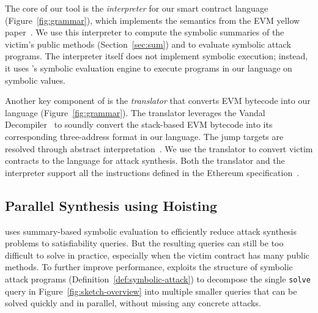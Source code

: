 The core of our tool is the \emph{interpreter} for our smart contract language
(Figure~\ref{fig:grammar}), which implements the semantics from the EVM
yellow paper~\cite{evm-yellow}. We use this interpreter to compute the symbolic
summaries of the victim's public methods (Section~\ref{sec:sum}) and to evaluate
symbolic attack programs. The interpreter itself does not implement symbolic
execution; instead, it uses \rosette's symbolic evaluation engine to execute
programs in our language on symbolic values. 

Another key component of \toolname is the \emph{translator} that converts EVM
bytecode into our language (Figure~\ref{fig:grammar}). The translator leverages the Vandal
Decompiler~\cite{madmax} to soundly convert the stack-based EVM bytecode into
its corresponding three-address format in our language. The jump targets are resolved through abstract
interpretation~\cite{CousotC77}.  We use the translator to convert victim
contracts to the \toolname language for attack synthesis. Both the translator and the
interpreter support all the instructions defined in the Ethereum
specification~\cite{yellowpaper}.




\subsection{Parallel Synthesis using Hoisting}\label{sec:parallel}

\toolname uses summary-based symbolic evaluation to efficiently reduce attack
synthesis problems to satisfiability queries. But the resulting queries can
still be too difficult %
to solve
in practice, especially when the victim contract has many public methods. To
further improve performance, \toolname exploits the structure of symbolic attack
programs (Definition~\ref{def:symbolic-attack}) to decompose the single
\texttt{solve} query in Figure~\ref{fig:sketch-overview} into multiple smaller
queries that can be solved quickly and in parallel, without missing any concrete
attacks.

